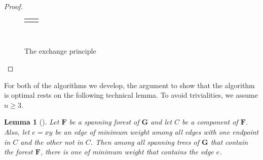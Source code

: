 \documentclass[10pt,]{book}
\theoremstyle{plain}
\newtheorem{lemma}[theorem]{Lemma}
\theoremstyle{definition}
\theoremstyle{definition}
\theoremstyle{definition}
\theoremstyle{definition}
\numberwithin{equation}{section}
\newlength{\panelmax}
\newcommand{\bfG}{\mathbf{G}}
\newcommand{\bfF}{\mathbf{F}}
\begin{document}
\begin{proof}
\begin{figure}
{\begin{lrbox}{\panelboxBimage}
\end{lrbox}
\ifdefined\phBimage\else\newlength{\phBimage}\fi%
\setlength{\phBimage}{\ht\panelboxBimage+\dp\panelboxBimage}
\settototalheight{\phBimage}{\usebox{\panelboxBimage}}
\setlength{\panelmax}{\maxof{\panelmax}{\phBimage}}
\leavevmode%
\setlength{\tabcolsep}{0.01\linewidth}
\par\medskip\noindent
\hspace*{0.01\linewidth}%
\begin{tabular}{@{}*{2}{c}@{}}
\begin{minipage}[c][\panelmax][t]{0.48\linewidth}\usebox{\panelboxAimage}\end{minipage}&
\begin{minipage}[c][\panelmax][t]{0.48\linewidth}\usebox{\panelboxBimage}\end{minipage}\end{tabular}\\
}%
\caption{The exchange principle\label{fig_graphalgorithms_exchange}}
\end{figure}
\end{proof}
\hypertarget{p-163}{}%
For both of the algorithms we develop, the argument to show that the algorithm is optimal rests on the following technical lemma. To avoid trivialities, we assume \(n\ge3\).%
\begin{lemma}[{}]\label{lem_graphalgorithms_tech}
\hypertarget{p-164}{}%
Let \(\bfF\) be a spanning forest of \(\bfG\) and let \(C\) be a component of \(\bfF\). Also, let \(e=xy\) be an edge of minimum weight among all edges with one endpoint in \(C\) and the other not in \(C\). Then among all spanning trees of \(\bfG\) that contain the forest \(\bfF\), there is one of minimum weight that contains the edge \(e\).%
\end{lemma}
\end{document}
